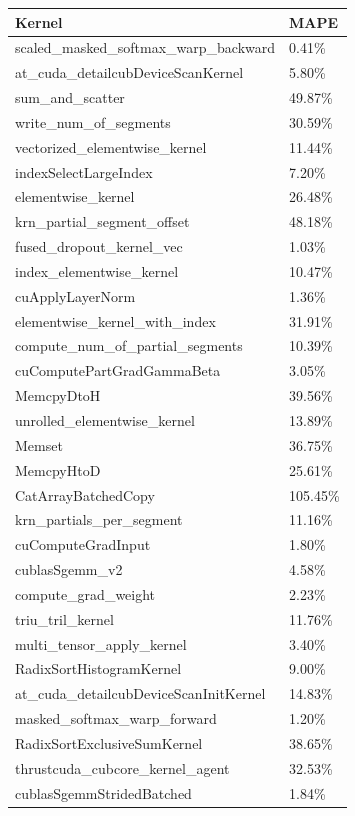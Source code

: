 \begin{table}[htbp]
\centering
\begin{tabular}{l l}
\toprule
\textbf{Kernel} & \textbf{MAPE}\\
\midrule
scaled\_masked\_softmax\_warp\_backward & 0.41\% \\
at\_cuda\_detailcubDeviceScanKernel & 5.80\% \\
sum\_and\_scatter & 49.87\% \\
write\_num\_of\_segments & 30.59\% \\
vectorized\_elementwise\_kernel & 11.44\% \\
indexSelectLargeIndex & 7.20\% \\
elementwise\_kernel & 26.48\% \\
krn\_partial\_segment\_offset & 48.18\% \\
fused\_dropout\_kernel\_vec & 1.03\% \\
index\_elementwise\_kernel & 10.47\% \\
cuApplyLayerNorm & 1.36\% \\
elementwise\_kernel\_with\_index & 31.91\% \\
compute\_num\_of\_partial\_segments & 10.39\% \\
cuComputePartGradGammaBeta & 3.05\% \\
MemcpyDtoH & 39.56\% \\
unrolled\_elementwise\_kernel & 13.89\% \\
Memset & 36.75\% \\
MemcpyHtoD & 25.61\% \\
CatArrayBatchedCopy & 105.45\% \\
krn\_partials\_per\_segment & 11.16\% \\
cuComputeGradInput & 1.80\% \\
cublasSgemm\_v2 & 4.58\% \\
compute\_grad\_weight & 2.23\% \\
triu\_tril\_kernel & 11.76\% \\
multi\_tensor\_apply\_kernel & 3.40\% \\
RadixSortHistogramKernel & 9.00\% \\
at\_cuda\_detailcubDeviceScanInitKernel & 14.83\% \\
masked\_softmax\_warp\_forward & 1.20\% \\
RadixSortExclusiveSumKernel & 38.65\% \\
thrustcuda\_cubcore\_kernel\_agent & 32.53\% \\
cublasSgemmStridedBatched & 1.84\% \\

\end{tabular}
\end{table}
